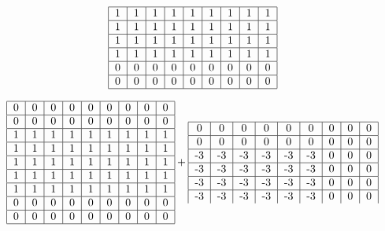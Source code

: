 \documentclass{article}
\begin{document}
\begin{equation}
\begin{tabular}{ | c | c | c | c | c | c | c | c | c | }
        \hline
        1 & 1 & 1 & 1 & 1 & 1 & 1 & 1 & 1 \\ 
        \hline
        1 & 1 & 1 & 1 & 1 & 1 & 1 & 1 & 1 \\ 
        \hline
        1 & 1 & 1 & 1 & 1 & 1 & 1 & 1 & 1 \\ 
        \hline
        1 & 1 & 1 & 1 & 1 & 1 & 1 & 1 & 1 \\ 
        \hline
        0 & 0 & 0 & 0 & 0 & 0 & 0 & 0 & 0 \\ 
        \hline
        0 & 0 & 0 & 0 & 0 & 0 & 0 & 0 & 0 \\ 
        \hline
    \end{tabular}
\end{equation}

\begin{equation}
    \begin{tabular}{ | c | c | c | c | c | c | c | c | c | }
        \hline
        0 & 0 & 0 & 0 & 0 & 0 & 0 & 0 & 0 \\ 
        \hline
        0 & 0 & 0 & 0 & 0 & 0 & 0 & 0 & 0 \\ 
        \hline
        1 & 1 & 1 & 1 & 1 & 1 & 1 & 1 & 1 \\ 
        \hline
        1 & 1 & 1 & 1 & 1 & 1 & 1 & 1 & 1 \\ 
        \hline
        1 & 1 & 1 & 1 & 1 & 1 & 1 & 1 & 1 \\ 
        \hline
        1 & 1 & 1 & 1 & 1 & 1 & 1 & 1 & 1 \\ 
        \hline
        1 & 1 & 1 & 1 & 1 & 1 & 1 & 1 & 1 \\ 
        \hline
        0 & 0 & 0 & 0 & 0 & 0 & 0 & 0 & 0 \\ 
        \hline
        0 & 0 & 0 & 0 & 0 & 0 & 0 & 0 & 0 \\ 
        \hline
    \end{tabular} + 
    \begin{tabular}{ | c | c | c | c | c | c | c | c | c | }
        \hline
        0 & 0 & 0 & 0 & 0 & 0 & 0 & 0 & 0 \\ 
        \hline
        0 & 0 & 0 & 0 & 0 & 0 & 0 & 0 & 0 \\ 
        \hline
        -3 & -3 & -3 & -3 & -3 & -3 & 0 & 0 & 0 \\ 
        \hline
        -3 & -3 & -3 & -3 & -3 & -3 & 0 & 0 & 0 \\ 
        \hline
        -3 & -3 & -3 & -3 & -3 & -3 & 0 & 0 & 0 \\ 
        \hline
        -3 & -3 & -3 & -3 & -3 & -3 & 0 & 0 & 0 \\ 

\end{tabular}
\end{equation}
\end{document}
